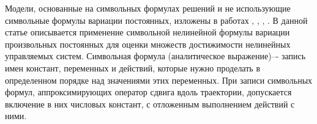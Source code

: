 
 Модели, основанные на символьных формулах решений и не использующие символьные формулы вариации постоянных, изложены в работах \cite{Rogalev1}, \cite{Rogalev5}, \cite{Rogalev6}, \cite{Rogalev7}.
  В данной статье описывается применение символьной нелинейной формулы вариации произвольных постоянных для  оценки множеств достижимости нелинейных управляемых систем.
Символьная формула (аналитическое выражение)–- запись имен констант, переменных и действий, которые нужно проделать в определенном порядке над значениями этих переменных.
При записи символьных формул, аппроксимирующих оператор сдвига вдоль траектории, допускается включение в них числовых констант, с отложенным выполнением действий с ними.



